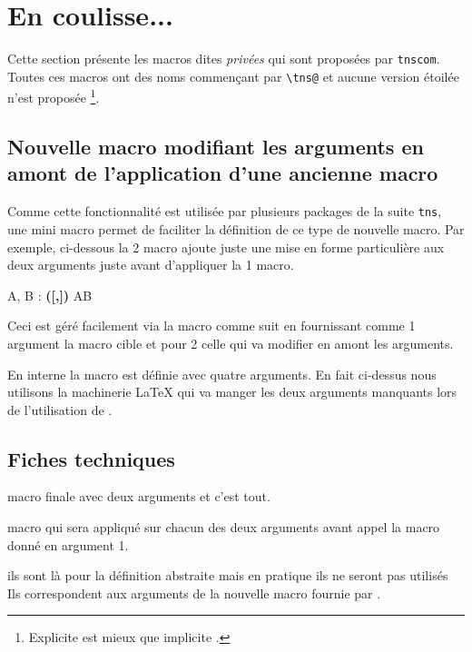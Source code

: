 \documentclass[12pt,a4paper]{article}
\begin{document}
\section{En coulisse...}

Cette section présente les macros dites \emph{\og privées \fg} qui sont proposées par \verb+tnscom+.
Toutes ces macros ont des noms commençant par \verb+\tns@+ et aucune version étoilée n'est proposée
\footnote{
	\og Explicite \fg{} est mieux que \og implicite \fg{}.
}.


\subsection{Nouvelle macro modifiant les arguments en amont de l'application d'une ancienne macro}

Comme cette fonctionnalité est utilisée par plusieurs packages de la suite \verb+tns+, une mini macro permet de faciliter la définition de ce type de nouvelle macro.
Par exemple, ci-dessous la 2\ieme{} macro ajoute juste une mise en forme particulière aux deux arguments juste avant d'appliquer la 1\iere{} macro.

\makeatletter
\newcommand\twoargs[2]{#1, #2}
\newcommand\modify[1]{\textbf{([#1])}}
\def\newtwoargs{\tns@apply@macro@two@args\twoargs\modify}
\makeatother

\begin{latexex}
\twoargs{A}{B} : \newtwoargs{A}{B}
\end{latexex}


Ceci est géré facilement via la macro  comme suit en fournissant comme 1\ier{} argument la macro cible et pour 2\ieme{} celle qui va modifier en amont les arguments.

\begin{latexex-alone}
\newcommand\twoargs[2]{#1, #2}
\newcommand\modify[1]{\textbf{([#1])}}

\def\newtwoargs{\tns@apply@macro@two@args\twoargs\modify}
\end{latexex-alone}


\begin{remark}
	En interne la macro  est définie avec quatre arguments.
	En fait ci-dessus nous utilisons la machinerie \LaTeX{} qui va manger les deux arguments manquants lors de l'utilisation de .
\end{remark}




\subsection{Fiches techniques}


 macro finale avec deux arguments et c'est tout.

 macro qui sera appliqué sur chacun des deux arguments avant appel la macro donné en argument 1.

 ils sont là pour la définition abstraite mais en pratique ils ne seront pas utilisés
Ils correspondent aux arguments de la nouvelle macro fournie par .
\end{document}

